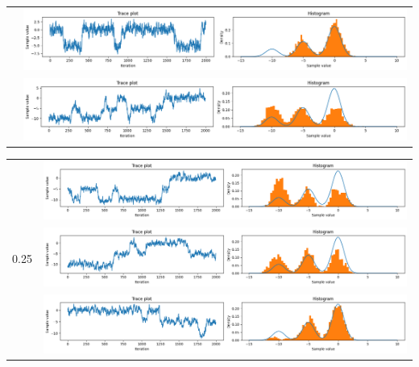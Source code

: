 \documentclass{article}
\theoremstyle{definition}
\newcommand{\1}{\mathbbm{1}}
\begin{document}
{\begin{tabular}{|l|l|}
& \multicolumn{1}{l}{\includegraphics[width=0.8\linewidth, height=0.1\linewidth, valign=m]{Different variance/0_52.png}} \\
& \multicolumn{1}{l}{\includegraphics[width=0.8\linewidth, height=0.1\linewidth, valign=m]{Different variance/0_53.png}} \\
\hline
\end{tabular}

\begin{tabular}{|l|l|}
\hline
\multirow{3}{*}{0.25} & \multicolumn{1}{l}{\includegraphics[width=0.8\linewidth, height=0.1\linewidth, valign=m]{Different variance/0_251.png}} \\
& \multicolumn{1}{l}{\includegraphics[width=0.8\linewidth, height=0.1\linewidth, valign=m]{Different variance/0_252.png}} \\
& \multicolumn{1}{l}{\includegraphics[width=0.8\linewidth, height=0.1\linewidth, valign=m]{Different variance/0_253.png}} \\
\hline
\end{tabular}
}
\end{document}
